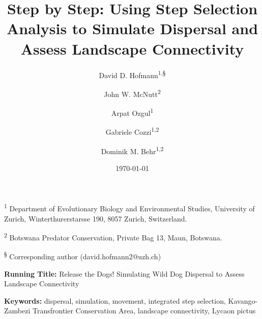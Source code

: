 \documentclass[abstract=on,10pt,a4paper,bibliography=totocnumbered]{article}
\title{Step by Step: Using Step Selection Analysis to Simulate Dispersal and
Assess Landscape Connectivity}
\author{
  David D. Hofmann\textsuperscript{1,\S} \and
  John W. McNutt\textsuperscript{2} \and
  Arpat Ozgul\textsuperscript{1} \and
  Gabriele Cozzi\textsuperscript{1,2} \and
  Dominik M. Behr\textsuperscript{1,2}
}
\date{\today}
\begin{document}



\maketitle

\begin{flushleft}

\vspace{0.5cm}

\textsuperscript{1} Department of Evolutionary Biology and Environmental
Studies, University of Zurich, Winterthurerstarsse 190, 8057 Zurich,
Switzerland.

\textsuperscript{2} Botswana Predator Conservation, Private Bag 13, Maun,
Botswana.

\textsuperscript{\S} Corresponding author (david.hofmann2@uzh.ch)

\vspace{4cm}

\textbf{Running Title:} Release the Dogs! Simulating Wild Dog Dispersal to
Assess Landscape Connectivity

\vspace{0.5cm}

\textbf{Keywords:} dispersal, simulation, movement, integrated step selection,
Kavango-Zambezi Transfrontier Conservation Area, landscape connectivity, Lycaon
pictus

\end{flushleft}
\end{document}
